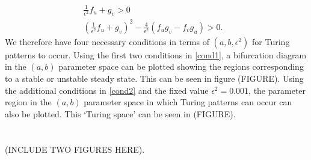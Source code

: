 \documentclass[12pt,a4paper]{report}
\begin{document}
\begin{equation}\label{cond2}
    \begin{split}
    \frac{1}{\epsilon^2}f_u+g_v>0&\\
    \left(\frac{1}{\epsilon^2}f_u+g_v\right)^2-\frac{4}{\epsilon^2}(f_ug_v-f_vg_u)>0.
\end{split}
\end{equation}
We therefore have four necessary conditions in terms of $(a,b,\epsilon^2)$ for Turing patterns to occur. Using the first two conditions in \eqref{cond1}, a bifurcation diagram in the $(a,b)$ parameter space can be plotted showing the regions corresponding to a stable or unstable steady state. This can be seen in figure (FIGURE). Using the additional conditions in \eqref{cond2} and the fixed value $\epsilon^2=0.001$, the parameter region in the $(a,b)$ parameter space in which Turing patterns can occur can also be plotted. This `Turing space' can be seen in (FIGURE).
\\
\\
\\

(INCLUDE TWO FIGURES HERE).


\printbibliography
\end{document}
